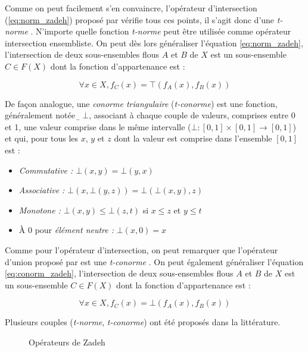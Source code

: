Comme on peut facilement s'en convaincre, l'opérateur d'intersection
(\autoref{eq:norm_zadeh}) proposé par \textcite{Zadeh1965} vérifie
tous ces points, il s'agit donc d'une \emph{t-norme}
\autocite{Bouchon-Meunier2007}. N'importe quelle fonction
\emph{t-norme} peut être utilisée comme opérateur intersection
ensembliste. On peut dès lors généraliser l'équation
\ref{eq:norm_zadeh}, l'intersection de deux sous-ensembles flous \(A\)
et \(B\) de \(X\) est un sous-ensemble \(C ∈ F(X)\) dont la fonction
d’appartenance est :

\begin{equation}
   ∀x ∈ X, f_C (x) = ⊤(f_A(x), f_B(x))  
\end{equation}

De façon analogue, une \emph{conorme triangulaire} (\emph{t-conorme})
est une fonction, généralement notée \(̱⊥\), associant à chaque couple
de valeurs, comprises entre 0 et 1, une valeur comprise dans le même
intervalle (\ie $⊥ : [0,1] × [0,1] \rightarrow [0,1]$) et qui, pour
tous les $x$, $y$ et $z$ dont la valeur est comprise dans l'ensemble
$[0,1]$ est :

\begin{itemize}
\item \emph{Commutative :} \(⊥(x,y) = ⊥(y,x)\)
\item \emph{Associative :} \(⊥(x,⊥(y,z)) = ⊥(⊥(x,y),z)\)
\item \emph{Monotone :} \(⊥(x,y) ≤ ⊥(z,t)\) si \(x ≤ z\) et \(y ≤ t\)
\item À \(0\) pour \emph{élément neutre :} \(⊥(x,0) = x\)
\end{itemize}

Comme pour l'opérateur d'intersection, on peut remarquer que
l'opérateur d'union proposé par \textcite{Zadeh1965} est une
\emph{t-conorme} \autocite{Bouchon-Meunier2007}. On peut également
généraliser l'équation \ref{eq:conorm_zadeh}, l'intersection de deux
sous-ensembles flous \(A\) et \(B\) de \(X\) est un sous-ensemble
\(C ∈ F(X)\) dont la fonction d’appartenance est :

\begin{equation}
     ∀x ∈ X, f_C (x) = ⊥(f_A(x), f_B(x))  
\end{equation}

Plusieurs couples (\emph{t-norme}, \emph{t-conorme}) ont été proposés
dans la littérature.

\begin{figure}
  \begin{center}
    \caption{Opérateurs de Zadeh}
    \label{fig:zadeh_op}
  \end{center}
\end{figure}

